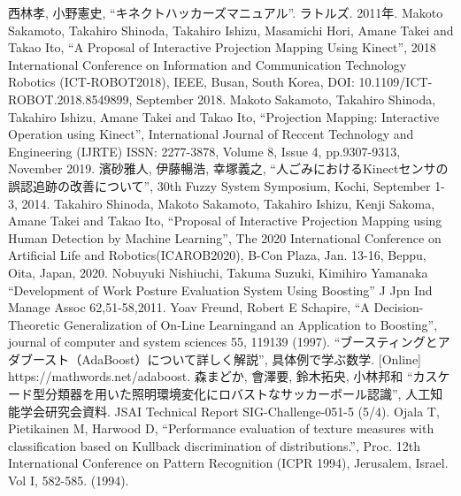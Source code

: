 \begin{thebibliography}{99}
 西林孝, 小野憲史, ``キネクトハッカーズマニュアル''. ラトルズ. 2011年.
 Makoto Sakamoto, Takahiro Shinoda, Takahiro Ishizu, Masamichi Hori, Amane Takei and  Takao Ito, ``A Proposal of Interactive Projection Mapping Using Kinect'', 2018 International Conference on Information and Communication Technology Robotics (ICT-ROBOT2018), IEEE, Busan, South Korea, DOI: 10.1109/ICT-ROBOT.2018.8549899, September 2018.
 Makoto Sakamoto, Takahiro Shinoda, Takahiro Ishizu, Amane Takei and Takao Ito, ``Projection Mapping: Interactive Operation using Kinect'', International Journal of Reccent Technology and Engineering (IJRTE) ISSN: 2277-3878, Volume 8, Issue 4, pp.9307-9313, November 2019. 
 濱砂雅人, 伊藤暢浩, 幸塚義之, ``人ごみにおけるKinectセンサの誤認追跡の改善について'', 30th Fuzzy System Symposium, Kochi, September 1-3, 2014.
 Takahiro Shinoda, Makoto Sakamoto, Takahiro Ishizu,  Kenji Sakoma, Amane Takei and Takao Ito, ``Proposal of Interactive Projection Mapping using Human Detection by Machine Learning'', The 2020 International Conference on Artificial Life and Robotics(ICAROB2020), B-Con Plaza, Jan. 13-16, Beppu, Oita, Japan, 2020.
 Nobuyuki Nishiuchi, Takuma Suzuki, Kimihiro Yamanaka ``Development of Work Posture Evaluation System Using Boosting'' J Jpn Ind Manage Assoc 62,51-58,2011.
 Yoav Freund, Robert E Schapire, ``A Decision-Theoretic Generalization of On-Line Learningand an Application to Boosting'', journal of computer and system sciences 55, 119139 (1997).
 ``ブースティングとアダブースト（AdaBoost）について詳しく解説'', 具体例で学ぶ数学. [Online] https://mathwords.net/adaboost. 
 森まどか, 會澤要, 鈴木拓央, 小林邦和 ``カスケード型分類器を用いた照明環境変化にロバストなサッカーボール認識'', 人工知能学会研究会資料. JSAI Technical Report SIG-Challenge-051-5 (5/4).
 Ojala T, Pietikainen M, Harwood D, ``Performance evaluation of texture measures with classification based on Kullback discrimination of distributions.'', Proc. 12th International Conference on Pattern Recognition (ICPR 1994), Jerusalem, Israel. Vol I, 582-585. (1994).


\end{thebibliography}    